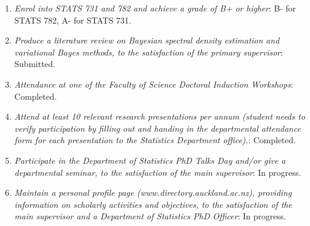 \documentclass[12pt,a4paper]{article}
\begin{document}
\begin{enumerate}
\item
\textit{Enrol into STATS 731 and 782 and achieve a grade of B+ or higher}:
B- for STATS 782, A- for STATS 731.

\item
\textit{Produce a literature review on Bayesian spectral density estimation and variational Bayes methods, to the satisfaction of
the primary supervisor}:
Submitted.

\item
\textit{Attendance at one of the Faculty of Science Doctoral Induction Workshops}:
Completed.

\item
\textit{Attend at least 10 relevant research presentations per annum (student needs to verify participation by filling out and
handing in the departmental attendance form for each presentation to the Statistics Department office).}:
Completed.

\item
\textit{Participate in the Department of Statistics PhD Talks Day and/or give a departmental seminar, to the satisfaction of the
main supervisor}:
In progress.

\item
\textit{Maintain a personal profile page (www.directory.auckland.ac.nz), providing information on scholarly activities and
objectives, to the satisfaction of the main supervisor and a Department of Statistics PhD Officer}:
In progress.


\end{enumerate}
\end{document}
